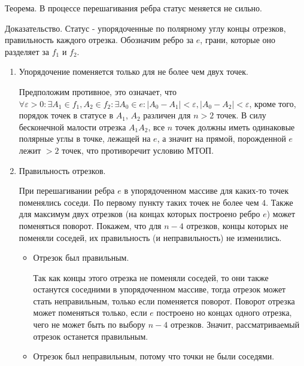 \documentclass[letterpaper,12pt]{article}
\begin{document}
\hspace{4em}

\begin{center}
      Теорема. В процессе перешагивания ребра статус меняется не сильно.
\end{center}
Доказательство.
Статус - упорядоченные по полярному углу концы отрезков, 
правильность каждого отрезка. Обозначим ребро за $e$, грани, которые оно 
разделяет за $f_1$ и $f_2$.
\begin{enumerate}
      \item Упорядочение поменяется только для не более чем двух точек.
 
            Предположим противное, это означает, что
            $\forall \varepsilon > 0 : \exists A_1 \in f_1, A_2 \in f_2 : 
            \exists A_0 \in e  :  |A_0 - A_1|  < \varepsilon, 
            |A_0 - A_2|  < \varepsilon$,
            кроме того, порядок точек в статусе в $A_1$, $A_2$ различен 
            для $n > 2$ точек. В силу бесконечной малости отрезка $A_1 A_2$,
            все $n$ точек должны иметь одинаковые полярные углы в точке,
            лежащей на $e$, а значит на прямой, порожденной $e$ лежит $>2$
            точек, что противоречит условию МТОП.
      \item Правильность отрезков.

            При перешагивании ребра $e$ 
            в упорядоченном массиве для каких-то точек поменялись соседи.
            По первому пункту таких точек не более чем $4$.
            Также для максимум двух отрезков (на концах которых построено ребро $e$)
            может поменяться поворот.
            Покажем, что для $n-4$ отрезков, концы которых не поменяли соседей,
            их правильность (и неправильность) не изменились.
            \begin{itemize}
                  \item Отрезок был правильным.

                  Так как концы этого отрезка не поменяли соседей,
                  то они также останутся соседними в упорядоченном массиве,
                  тогда отрезок может стать неправильным, только если поменяется поворот.
                  Поворот отрезка может поменяться только,
                  если $e$ построено но концах одного отрезка,
                  чего не может быть по выбору $n-4$ отрезков.
                  Значит, рассматриваемый отрезок останется правильным. 

                  \item Отрезок был неправильным, потому что точки не были соседями.
                  

\end{itemize}
\end{enumerate}
\end{document}
